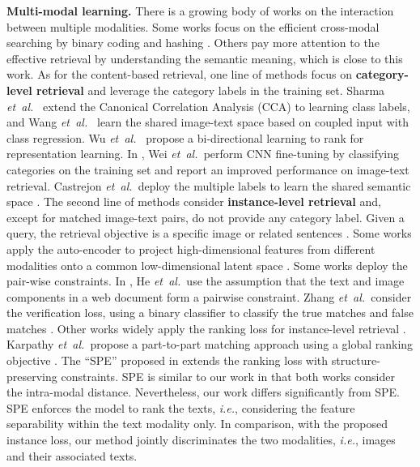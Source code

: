 \documentclass[10pt,final,journal]{IEEEtran}
\newcommand{\etal}{\mbox{\emph{et al.\ }}}
\newcommand{\ie}{\mbox{\emph{i.e.}}}
\begin{document}
\textbf{Multi-modal learning.}
There is a growing body of works on the interaction between multiple modalities. Some works focus on the efficient cross-modal searching by binary coding and hashing \cite{ding2016large,wang2016multimodal,zhang2017flexible}. Others pay more attention to the effective retrieval by understanding the semantic meaning, which is close to this work.
As for the content-based retrieval, one line of methods focus on \textbf{category-level retrieval} and leverage the category labels in the training set.
Sharma \etal \cite{sharma2012generalized} extend the Canonical Correlation Analysis \cite{hardoon2004canonical} (CCA) to learning class labels, and Wang \etal \cite{wang2013learning} learn the shared image-text space based on coupled input with class regression. Wu \etal \cite{wu2013cross} propose a bi-directional learning to rank for representation learning. In \cite{wei2017cross}, Wei \etal perform CNN fine-tuning by classifying categories on the training set and report an improved performance on image-text retrieval. Castrejon \etal deploy the multiple labels to learn the shared semantic space \cite{castrejon2016learning}.
The second line of methods consider \textbf{instance-level retrieval} and, except for matched image-text pairs, do not provide any category label. Given a query, the retrieval objective is a specific image or related sentences \cite{liu2017new}. Some works apply the auto-encoder to project high-dimensional features from different modalities onto a common low-dimensional latent space \cite{wang2014effective,eisenschtat2016linking}. 
Some works deploy the pair-wise constraints. In \cite{he2015cross}, He \etal use the assumption that the text and image components in a web document form a pairwise constraint. Zhang \etal consider the verification loss, using a binary classifier to classify the true matches and false matches \cite{zhang2017discriminative}. 
Other works widely apply the ranking loss for instance-level retrieval \cite{frome2013devise,karpathy2014deep,ma2015multimodal,wang2016learning,nam2016dual,reed2016learning}. Karpathy \etal propose a part-to-part matching approach using a global ranking objective \cite{karpathy2014deep}. 
The ``SPE'' proposed in \cite{wang2016learning} extends the ranking loss with structure-preserving constraints. SPE is similar to our work in that both works consider the intra-modal distance. Nevertheless, our work differs significantly from SPE. SPE enforces the model to rank the texts, \ie, considering the feature separability within the text modality only.
In comparison, with the proposed instance loss, our method jointly discriminates the two modalities, \ie, images and their associated texts.
\end{document}
